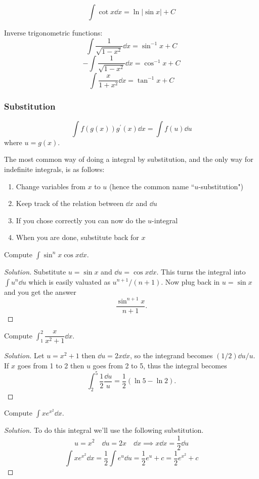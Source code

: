 \[ \int \cot x \dd{x} = \ln|\sin x| + C \]

Inverse trigonometric functions:
\[ \int \frac{1}{\sqrt{1-x^2}} \dd{x} = \sin^{-1}x + C \]
\[ -\int \frac{1}{\sqrt{1-x^2}} \dd{x} = \cos^{-1}x + C \]
\[ \int \frac{x}{1+x^2} \dd{x} = \tan^{-1}x + C \]

\subsubsection{Substitution}
\begin{equation}
\int f(g(x)) g^\prime (x) \dd{x} = \int f(u) \dd{u}
\end{equation}
where $u=g(x)$.

The most common way of doing a integral by substitution, and the only way for indefinite integrals, is as follows:
\begin{enumerate}
\item Change variables from $x$ to $u$ (hence the common name ``$u$-substitution")
\item Keep track of the relation between $\dd{x}$ and $\dd{u}$
\item If you chose correctly you can now do the $u$-integral
\item When you are done, substitute back for $x$
\end{enumerate}

\begin{exmp}{}{}
Compute $\int\sin^nx\cos x\dd{x}$.
\end{exmp}
\begin{proof}[Solution]
Substitute $u = \sin x$ and $\dd{u} = \cos x \dd{x}$. This turns the integral into $\int u^n\dd{u}$ which is easily valuated as $u^{n+1}/(n+1)$. Now plug back in $u = \sin x$ and you get the answer
\[ \frac{\sin^{n+1}x}{n+1}. \]
\end{proof}

\begin{exmp}{}{}
Compute $\int_1^2\dfrac{x}{x^2+1}\dd{x}$.
\end{exmp}
\begin{proof}[Solution]
Let $u=x^2+1$ then $\dd{u} = 2x \dd{x}$, so the integrand becomes $(1/2)\dd{u}/u$. If $x$ goes
from 1 to 2 then $u$ goes from 2 to 5, thus the integral becomes
\[ \int_2^5\frac{1}{2}\frac{\dd{u}}{u} = \frac{1}{2}(\ln5-\ln2). \]
\end{proof}

\begin{exmp}{}{}
Compute $\int xe^{x^2}\dd{x}$.
\end{exmp}
\begin{proof}[Solution]
To do this integral we'll use the following substitution.
\[ u = x^2 \quad \dd{u} = 2x \quad \dd{x} \implies x \dd{x} = \frac{1}{2} \dd{u} \]
\[ \int x e^{x^2} \dd{x} = \frac{1}{2}\int e^u \dd{u} = \frac{1}{2}e^u + c = \frac{1}{2}e^{x^2} + c \]
\end{proof}



